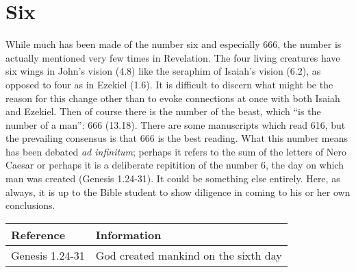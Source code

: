\section*{Six}
While much has been made of the number six and especially 666, the number is actually mentioned very few times in Revelation. The four living creatures have six wings in John's vision (4.8) like the seraphim of Isaiah's vision (6.2), as opposed to four as in Ezekiel (1.6). It is difficult to discern what might be the reason for this change other than to evoke connections at once with both Isaiah and Ezekiel.
\newline\newline
Then of course there is the number of the beast, which ``is the number of a man'': 666 (13.18). There are some manuscripts which read 616, but the prevailing consensus is that 666 is the best reading. What this number means has been debated \textit{ad infinitum}; perhaps it refers to the sum of the letters of Nero Caesar or perhaps it is a deliberate repitition of the number 6, the day on which man was created (Genesis 1.24-31). It could be something else entirely. Here, as always, it is up to the Bible student to show diligence in coming to his or her own conclusions.
\newline\newline
\begin{tabularx}{\textwidth}{l X}
\toprule
\textbf{Reference} & \textbf{Information}\\
\midrule
Genesis 1.24-31 & God created mankind on the sixth day \\
\bottomrule
\end{tabularx}

